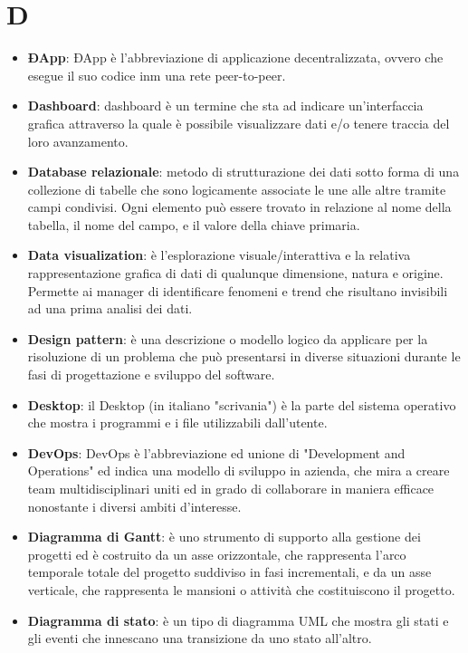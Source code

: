 \documentclass[a4paper, oneside, openany, dvipsnames, table]{article}
\begin{document}
\section{D}
\begin{itemize}
\item \textbf{ÐApp}: ÐApp è l'abbreviazione di applicazione decentralizzata, ovvero che esegue il suo codice inm una rete peer-to-peer.
\item \textbf{Dashboard}: dashboard è un termine che sta ad indicare un'interfaccia grafica attraverso la quale è possibile visualizzare dati e/o tenere traccia del loro avanzamento.
\item \textbf{Database relazionale}: metodo di strutturazione dei dati sotto forma di una collezione di tabelle che sono logicamente associate le une alle altre tramite campi condivisi. Ogni elemento può essere trovato in relazione al nome della tabella, il nome del campo, e il valore della chiave primaria.
\item \textbf{Data visualization}: è l'esplorazione visuale/interattiva e la relativa rappresentazione grafica di dati di qualunque dimensione, natura e origine. Permette ai manager di identificare fenomeni e trend che risultano invisibili ad una prima analisi dei dati.
\item \textbf{Design pattern}: è una descrizione o modello logico da applicare per la risoluzione di un problema che può presentarsi in diverse situazioni durante le fasi di progettazione e sviluppo del software.
\item \textbf{Desktop}: il Desktop (in italiano "scrivania") è la parte del sistema operativo che mostra i programmi e i file utilizzabili dall'utente.
\item \textbf{DevOps}: DevOps è l'abbreviazione ed unione di "Development and Operations" ed indica una modello di sviluppo in azienda, che mira a creare team multidisciplinari uniti ed in grado di collaborare in maniera efficace nonostante i diversi ambiti d'interesse.
\item \textbf{Diagramma di Gantt}: è uno strumento di supporto alla gestione dei progetti ed è costruito da un asse orizzontale, che rappresenta l'arco temporale totale del progetto suddiviso in fasi incrementali, e da un asse verticale, che rappresenta le mansioni o attività che costituiscono il progetto.
\item \textbf{Diagramma di stato}: è un tipo di diagramma UML che mostra gli stati e gli eventi che innescano una transizione da uno stato all'altro.
\end{itemize}
\end{document}
